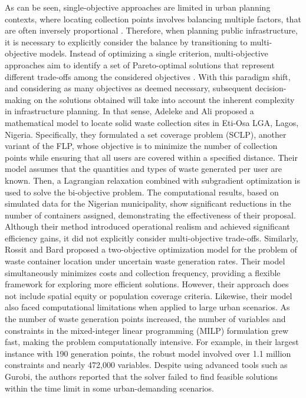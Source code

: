 As can be seen, single-objective approaches are limited in urban planning contexts, where locating collection points involves balancing multiple factors, that are often inversely proportional \cite{farahani2010multiple}. Therefore, when planning public infrastructure, it is necessary to explicitly consider the balance by transitioning to multi-objective models. Instead of optimizing a single criterion, multi-objective approaches aim to identify a set of Pareto-optimal solutions that represent different trade-offs among the considered objectives \cite{tuvsar2014visualization}. With this paradigm shift, and considering as many objectives as deemed necessary, subsequent decision-making on the solutions obtained will take into account the inherent complexity in infrastructure planning. In that sense, Adeleke and Ali \cite{adeleke2021efficient} proposed a mathematical model to locate solid waste collection sites in Eti-Osa LGA, Lagos, Nigeria. Specifically, they formulated a set coverage problem (SCLP), another variant of the FLP, whose objective is to minimize the number of collection points while ensuring that all users are covered within a specified distance. Their model assumes that the quantities and types of waste generated per user are known. Then, a Lagrangian relaxation combined with subgradient optimization is used to solve the bi-objective problem. The computational results, based on simulated data for the Nigerian municipality, show significant reductions in the number of containers assigned, demonstrating the effectiveness of their proposal. Although their method introduced operational realism and achieved significant efficiency gains, it did not explicitly consider multi-objective trade-offs. Similarly, Rossit and Bard \cite{rossit2025solving} proposed a two-objective optimization model for the problem of waste container location under uncertain waste generation rates. Their model simultaneously minimizes costs and collection frequency, providing a flexible framework for exploring more efficient solutions. However, their approach does not include spatial equity or population coverage criteria. Likewise, their model also faced computational limitations when applied to large urban scenarios. As the number of waste generation points increased, the number of variables and constraints in the mixed-integer linear programming (MILP) formulation grew fast, making the problem computationally intensive. For example, in their largest instance with 190 generation points, the robust model involved over 1.1 million constraints and nearly 472,000 variables. Despite using advanced tools such as Gurobi, the authors reported that the solver failed to find feasible solutions within the time limit in some urban-demanding scenarios.  

